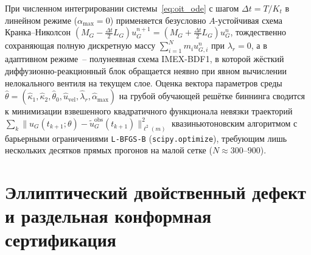 При численном интегрировании системы~\eqref{eq:oit_ode} с шагом $\Delta t = T/K_t$ в линейном режиме ($\alpha_{\max}=0$) применяется безусловно $A$-устойчивая схема Кранка--Николсон $(M_G - \frac{\Delta t}{2}L_G)u_G^{n+1} = (M_G + \frac{\Delta t}{2}L_G)u_G^n$, тождественно сохраняющая полную дискретную массу $\sum_{i=1}^N m_i u_{G,i}^n$ при $\lambda_r=0$, а в адаптивном режиме~-- полунеявная схема IMEX-BDF1, в которой жёсткий диффузионно-реакционный блок обращается неявно при явном вычислении нелокального вентиля на текущем слое. Оценка вектора параметров среды $\hat{\theta}=(\hat{\kappa}_1,\hat{\kappa}_2,\hat{\theta}_0,\hat{u}_{\mathrm{vel}},\hat{\lambda}_r,\hat{\alpha}_{\max})$ на грубой обучающей решётке биннинга сводится к минимизации взвешенного квадратичного функционала невязки траекторий $\sum_k \|u_G(t_{k+1};\theta)-\tilde{u}_G^{\mathrm{obs}}(t_{k+1})\|_{\ell^2(m)}^2$ квазиньютоновским алгоритмом с барьерными ограничениями \texttt{L-BFGS-B} (\texttt{scipy.optimize}), требующим лишь нескольких десятков прямых прогонов на малой сетке ($N\approx 300\text{--}900$).

\section{Эллиптический двойственный дефект и раздельная конформная сертификация}

